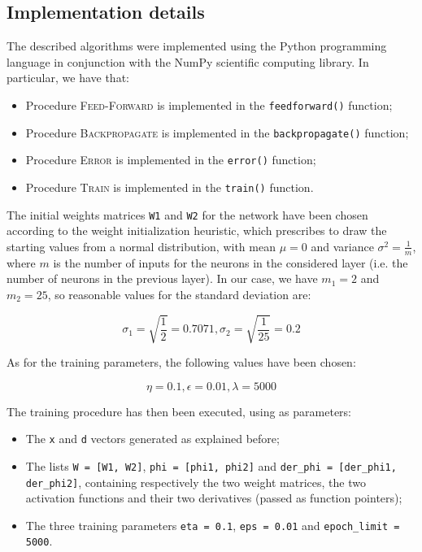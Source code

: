 \documentclass[letterpaper,headings=standardclasses]{scrartcl}
\begin{document}
\subsection{Implementation details}

The described algorithms were implemented using the Python programming language in conjunction with the NumPy scientific computing library. In particular, we have that:

\begin{itemize}
    \item Procedure \textsc{Feed-Forward} is implemented in the \texttt{feedforward()} function;
    \item Procedure \textsc{Backpropagate} is implemented in the \texttt{backpropagate()} function;
    \item Procedure \textsc{Error} is implemented in the \texttt{error()} function;
    \item Procedure \textsc{Train} is implemented in the \texttt{train()} function.
\end{itemize}

The initial weights matrices \texttt{W1} and \texttt{W2} for the network have been chosen according to the weight initialization heuristic, which prescribes to draw the starting values from a normal distribution, with mean $\mu = 0$ and variance $\sigma^2 = \frac{1}{m}$, where $m$ is the number of inputs for the neurons in the considered layer (i.e. the number of neurons in the previous layer). In our case, we have $m_1 = 2$ and $m_2 = 25$, so reasonable values for the standard deviation are:

$$ \sigma_1 = \sqrt{\frac{1}{2}} = 0.7071, \sigma_2 = \sqrt{\frac{1}{25}} = 0.2 $$

As for the training parameters, the following values have been chosen:

$$ \eta = 0.1, \epsilon = 0.01, \lambda = 5000 $$

The training procedure has then been executed, using as parameters:

\begin{itemize}
    \item The \texttt{x} and \texttt{d} vectors generated as explained before;
    \item The lists \texttt{W = [W1, W2]}, \texttt{phi = [phi1, phi2]} and \texttt{der\_phi = [der\_phi1, der\_phi2]}, containing respectively the two weight matrices, the two activation functions and their two derivatives (passed as function pointers);
    \item The three training parameters \texttt{eta = 0.1}, \texttt{eps = 0.01} and \texttt{epoch\_limit = 5000}.
\end{itemize}
\end{document}
